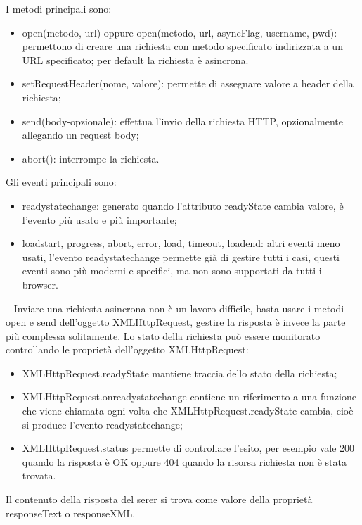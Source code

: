 I metodi principali sono:
\begin{itemize}
    \item open(metodo, url) oppure open(metodo, url, asyncFlag, username, pwd): permettono di creare una richiesta con metodo specificato indirizzata a un URL specificato; per default la richiesta è asincrona.
    \item setRequestHeader(nome, valore): permette di assegnare valore a header della richiesta;
    \item send(body-opzionale): effettua l'invio della richiesta HTTP, opzionalmente allegando un request body;
    \item abort(): interrompe la richiesta.
\end{itemize}
Gli eventi principali sono:
\begin{itemize}
    \item readystatechange: generato quando l'attributo readyState cambia valore, è l'evento più usato e più importante;
    \item loadstart, progress, abort, error, load, timeout, loadend: altri eventi meno usati, l'evento readystatechange permette già di gestire tutti i casi, questi eventi sono più moderni e specifici, ma non sono supportati da tutti i browser.
\end{itemize}
\ \newline
Inviare una richiesta asincrona non è un lavoro difficile, basta usare i metodi open e send dell'oggetto XMLHttpRequest, gestire la risposta è invece la parte più complessa solitamente.\newline
Lo stato della richiesta può essere monitorato controllando le proprietà dell'oggetto XMLHttpRequest:
\begin{itemize}
    \item XMLHttpRequest.readyState mantiene traccia dello stato della richiesta;
    \item XMLHttpRequest.onreadystatechange contiene un riferimento a una funzione che viene chiamata ogni volta che XMLHttpRequest.readyState cambia, cioè si produce l'evento readystatechange;
    \item XMLHttpRequest.status permette di controllare l'esito, per esempio vale 200 quando la risposta è OK oppure 404 quando la risorsa richiesta non è stata trovata.
\end{itemize}
Il contenuto della risposta del serer si trova come valore della proprietà responseText o responseXML.\newline
\newline
